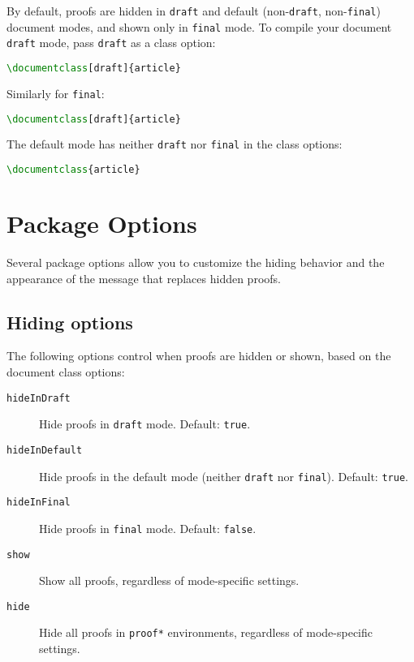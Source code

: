 \documentclass{article}
\begin{document}
By default, proofs are hidden in \texttt{draft} and default (non-\texttt{draft}, non-\texttt{final}) document modes, and shown only in \texttt{final} mode.
To compile your document \texttt{draft} mode, pass \texttt{draft} as a class option:
\begin{lstlisting}[language=TeX]
\documentclass[draft]{article}
\end{lstlisting}
Similarly for \texttt{final}:
\begin{lstlisting}[language=TeX]
\documentclass[draft]{article}
\end{lstlisting}
The default mode has neither \texttt{draft} nor \texttt{final} in the class options:
\begin{lstlisting}[language=TeX]
\documentclass{article}
\end{lstlisting}

\section{Package Options}

Several package options allow you to customize the hiding behavior and the appearance of the message that replaces hidden proofs.

\subsection*{Hiding options}

The following options control when proofs are hidden or shown, based on the document class options:
\begin{description}
  \item[\texttt{hideInDraft}] Hide proofs in \texttt{draft} mode. Default: \texttt{true}.
  \item[\texttt{hideInDefault}] Hide proofs in the default mode (neither \texttt{draft} nor \texttt{final}). Default: \texttt{true}.
  \item[\texttt{hideInFinal}] Hide proofs in \texttt{final} mode. Default: \texttt{false}.
  \item[\texttt{show}] Show all proofs, regardless of mode-specific settings.
  \item[\texttt{hide}] Hide all proofs in \texttt{proof*} environments, regardless of mode-specific settings.
\end{description}
\end{document}
